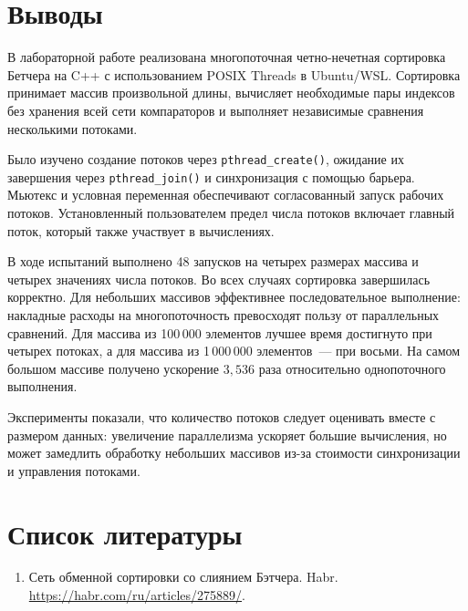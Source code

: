 \documentclass[12pt,a4paper,oneside]{article}
\begin{document}
\section{Выводы}
В лабораторной работе реализована многопоточная четно-нечетная сортировка Бетчера на C++ с использованием POSIX Threads в Ubuntu/WSL. Сортировка принимает массив произвольной длины, вычисляет необходимые пары индексов без хранения всей сети компараторов и выполняет независимые сравнения несколькими потоками.

Было изучено создание потоков через \texttt{pthread\_create()}, ожидание их завершения через \texttt{pthread\_join()} и синхронизация с помощью барьера. Мьютекс и условная переменная обеспечивают согласованный запуск рабочих потоков. Установленный пользователем предел числа потоков включает главный поток, который также участвует в вычислениях.

В ходе испытаний выполнено 48 запусков на четырех размерах массива и четырех значениях числа потоков. Во всех случаях сортировка завершилась корректно. Для небольших массивов эффективнее последовательное выполнение: накладные расходы на многопоточность превосходят пользу от параллельных сравнений. Для массива из 100\,000 элементов лучшее время достигнуто при четырех потоках, а для массива из 1\,000\,000 элементов~--- при восьми. На самом большом массиве получено ускорение $3{,}536$ раза относительно однопоточного выполнения.

Эксперименты показали, что количество потоков следует оценивать вместе с размером данных: увеличение параллелизма ускоряет большие вычисления, но может замедлить обработку небольших массивов из-за стоимости синхронизации и управления потоками.

\section{Список литературы}
\begin{enumerate}[noitemsep]
\item Сеть обменной сортировки со слиянием Бэтчера. Habr. \url{https://habr.com/ru/articles/275889/}.
\end{enumerate}
\end{document}
